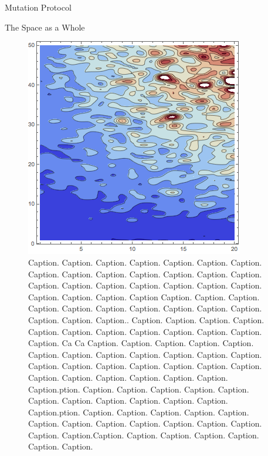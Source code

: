\documentclass[14pt]{beamer}
\renewcommand{\maketitle}{%
	\begin{center}%
		\Huge\inserttitle\\[5mm]%
		\Large\insertauthor\\[5mm]%
		\Large\insertinstitute%
	\end{center}%
	\vspace*{-1.5ex}%
}
\begin{document}
\begin{frame}{\maketitle}
\begin{columns}
\begin{column}{.45\textwidth}
\begin{exampleblock}{Mutation Protocol}
\end{exampleblock}
\vspace{1em}

\begin{block}{The Space as a Whole}

	\begin{figure}[htpb]
		\centering
			\includegraphics[scale=1.3]{cp2.png}
		\centering
		\caption{Caption. Caption. Caption. Caption. Caption. Caption. Caption. Caption. Caption. Caption. Caption. Caption. Caption. Caption. Caption. Caption. Caption. Caption. Caption. Caption. Caption. Caption. Caption. Caption. Caption Caption. Caption. Caption. Caption. Caption. Caption. Caption. Caption. Caption. Caption. Caption. Caption. Caption.. Caption.  Caption. Caption. Caption. Caption. Caption. Caption. Caption. Caption. Caption. Caption. Caption. Ca Ca Caption. Caption. Caption. Caption. Caption. Caption. Caption. Caption. Caption. Caption. Caption. Caption. Caption. Caption. Caption. Caption. Caption. Caption. Caption. Caption. Caption. Caption. Caption. Caption. Caption. Caption.ption. Caption. Caption. Caption. Caption. Caption. Caption. Caption. Caption. Caption. Caption. Caption. Caption.ption. Caption. Caption. Caption. Caption. Caption. Caption. Caption. Caption. Caption. Caption. Caption. Caption. Caption. Caption.Caption. Caption. Caption. Caption. Caption. Caption. Caption.}
		\label{fig:tot_plot}
	\end{figure}
	

\end{block}
\end{column}
\end{columns}
\end{frame}
\end{document}

